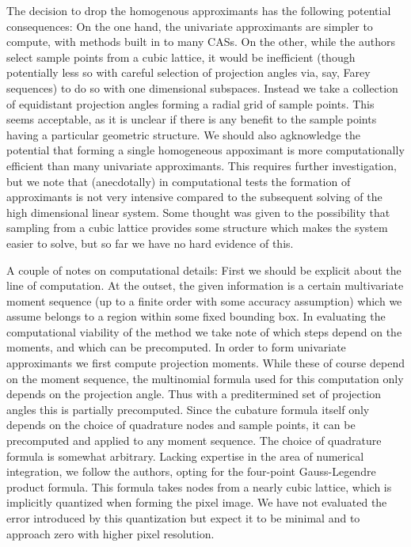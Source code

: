 \documentclass{amsart}
\theoremstyle{remark}
\numberwithin{equation}{section}
\begin{document}
The decision to drop the homogenous approximants has the following potential consequences: On the one hand, the univariate approximants are simpler to compute, with methods built in to many CASs. On the other, while the authors select sample points from a cubic lattice, it would be inefficient (though potentially less so with careful selection of projection angles via, say, Farey sequences) to do so with one dimensional subspaces. Instead we take a collection of equidistant projection angles forming a radial grid of sample points. This seems acceptable, as it is unclear if there is any benefit to the sample points having a particular geometric structure. We should also agknowledge the potential that forming a single homogeneous appoximant is more computationally efficient than many univariate approximants. This requires further investigation, but we note that (anecdotally) in computational tests the formation of approximants is not very intensive compared to the subsequent solving of the high dimensional linear system. Some thought was given to the possibility that sampling from a cubic lattice provides some structure which makes the system easier to solve, but so far we have no hard evidence of this.

A couple of notes on computational details: First we should be explicit about the line of computation. At the outset, the given information is a certain multivariate moment sequence (up to a finite order with some accuracy assumption) which we assume belongs to a region within some fixed bounding box. In evaluating the computational viability of the method we take note of which steps depend on the moments, and which can be precomputed. In order to form univariate approximants we first compute projection moments. While these of course depend on the moment sequence, the multinomial formula used for this computation only depends on the projection angle. Thus with a preditermined set of projection angles this is partially precomputed. Since the cubature formula itself only depends on the choice of quadrature nodes and sample points, it can be precomputed and applied to any moment sequence. The choice of quadrature formula is somewhat arbitrary. Lacking expertise in the area of numerical integration, we follow the authors, opting for the four-point Gauss-Legendre product formula. This formula takes nodes from a nearly cubic lattice, which is implicitly quantized when forming the pixel image. We have not evaluated the error introduced by this quantization but expect it to be minimal and to approach zero with higher pixel resolution.
\end{document}
